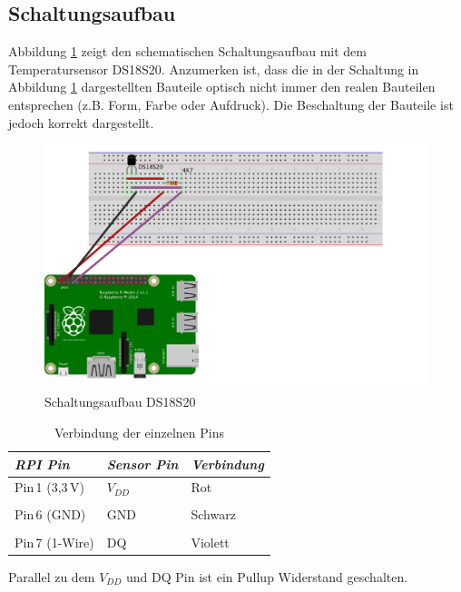 \subsection{Schaltungsaufbau}
\label{subsection_Schaltungsaufbau_DS18S20}

Abbildung \ref{Abb_Schaltung_DS18S20} zeigt den schematischen Schaltungsaufbau mit dem Temperatursensor DS18S20. Anzumerken ist, dass die in der Schaltung in Abbildung \ref{Abb_Schaltung_DS18S20} dargestellten Bauteile optisch nicht immer den realen Bauteilen entsprechen (z.B. Form, Farbe oder Aufdruck). Die Beschaltung der Bauteile ist jedoch korrekt dargestellt. 

\begin{figure}[!h] 
  \centering
     \includegraphics[scale=.75]{BilderAllgemein/Schaltung_DS18S20.png}
  \caption[Caption for LOF]{Schaltungsaufbau DS18S20\protect\footnotemark}
  \label{Abb_Schaltung_DS18S20}
\end{figure}

\begin{table}[H]
\centering
\begin{tabular}{
lll
}
\toprule

\multicolumn{1}{p{3cm}}{\textit{\ac{RPI}\;3 Pin}} & \multicolumn{1}{p{3cm}}{\textit{Sensor Pin} }&\multicolumn{1}{p{3cm}}{\textit{Verbindung}}\\\midrule
Pin\,1 (3,3\,V) & $V_{DD}$ & Rot\\
&&\\
Pin\,6 (GND) & GND & Schwarz\\
&&\\
Pin\,7 (1-Wire) & DQ & Violett\\

\bottomrule
\end{tabular}
\caption{Verbindung der einzelnen Pins}
\label{Tabelle_Elektrische_Daten_DS18S20}
\end{table}
 Parallel zu dem  $V_{DD}$ und DQ Pin ist ein Pullup Widerstand geschalten.

